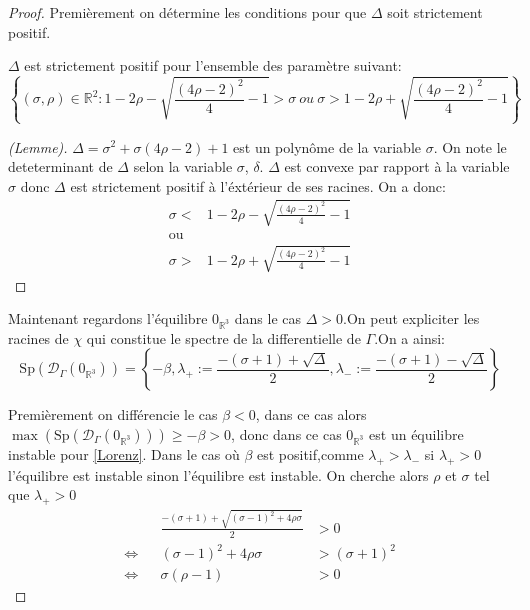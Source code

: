 \documentclass{article}
\newcommand{\R}{\mathbb{R}}
\newtheorem[M , nocut]{prop}{Proposition}[section]
\newtheorem[M , nocut]{definition}{Définition}
\newtheorem[M , nocut]{lemme}{Lemme}
\newtheorem[L , nocut]{thm}{Théoreme}
\newtheorem[M , nocut]{cor}{Corollaire}
\begin{document}
\begin{proof}
    Premièrement on détermine les conditions pour que $\Delta$ soit strictement positif.
    \begin{lemme}
        $\Delta$ est strictement positif pour l'ensemble des paramètre suivant:
        \[
         \left\{(\sigma,\rho)\in \R ^2 : 1-2 \rho - \sqrt{\frac{(4\rho-2)^2}{4} -1 } > \sigma\ ou \ \sigma > 1-2 \rho + \sqrt{ \frac{(4\rho-2)^2}{4} -1  } \right\}    
        \]
    \end{lemme}
    
        \begin{proof}[(Lemme)]
            $\Delta = \sigma^2 + \sigma(4\rho-2) + 1$ est un polynôme de la variable $\sigma$. On note le deteterminant de $\Delta$ selon la variable $\sigma$, $\delta$. $\Delta$ est convexe par rapport à la variable $\sigma$ donc $\Delta$ est strictement positif à l'éxtérieur de ses racines. On a donc:
            \begin{align*}
                \sigma <& 1-2 \rho - \sqrt{\frac{(4\rho-2)^2}{4} -1 }\\
                \text{ou}\\
                \sigma >& 1-2 \rho + \sqrt{\frac{(4\rho-2)^2}{4} -1 }
            \end{align*}
        \end{proof}
        
    Maintenant regardons l'équilibre $0_{\R^3}$ dans le cas $\Delta> 0$.On peut expliciter les racines de $\chi$ qui constitue le spectre de la differentielle de $\Gamma$.On a ainsi:
    \[
        \mathrm{Sp}(\mathcal{D}_\Gamma (0_{\R^3}))= \left\{-\beta,\lambda_+ := \frac{-(\sigma+1) + \sqrt{\Delta}}{2},\lambda_- := \frac{-(\sigma+1) - \sqrt{\Delta}}{2}\right\}  
    \]

    Premièrement on différencie le cas $\beta<0$, dans ce cas alors $\max(\mathrm{Sp}(\mathcal{D}_\Gamma (0_{\R^3})))\ge -\beta > 0$, donc dans ce cas $0_{\R^3}$ est un équilibre instable pour \eqref{Lorenz}. Dans le cas où $\beta$ est positif,comme $\lambda_+>\lambda_-$ si $\lambda_+ > 0$ l'équilibre est instable sinon l'équilibre est instable. On cherche alors $\rho$ et $\sigma$ tel que $\lambda_+>0$
    \begin{align*}
        && \frac{-(\sigma+1) + \sqrt{(\sigma-1)^2+4\rho\sigma}}{2} &>0 \\
        \Leftrightarrow && (\sigma-1)^2+4\rho\sigma &> (\sigma+1)^2 \\
        \Leftrightarrow && \sigma(\rho-1) &> 0
    \end{align*}
\end{proof}
\end{document}
